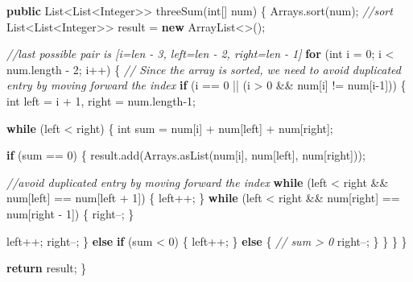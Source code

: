 \documentclass[]{book}
\newenvironment{Shaded}{\begin{snugshade}}{\end{snugshade}}
\newcommand{\BuiltInTok}[1]{#1}
\newcommand{\CommentTok}[1]{\textcolor[rgb]{0.56,0.35,0.01}{\textit{#1}}}
\newcommand{\DataTypeTok}[1]{\textcolor[rgb]{0.13,0.29,0.53}{#1}}
\newcommand{\DecValTok}[1]{\textcolor[rgb]{0.00,0.00,0.81}{#1}}
\newcommand{\FunctionTok}[1]{\textcolor[rgb]{0.00,0.00,0.00}{#1}}
\newcommand{\KeywordTok}[1]{\textcolor[rgb]{0.13,0.29,0.53}{\textbf{#1}}}
\newcommand{\NormalTok}[1]{#1}
\begin{document}
\begin{Shaded}
\begin{Highlighting}[]
\KeywordTok{public} \BuiltInTok{List}\NormalTok{<}\BuiltInTok{List}\NormalTok{<}\BuiltInTok{Integer}\NormalTok{>> }\FunctionTok{threeSum}\NormalTok{(}\DataTypeTok{int}\NormalTok{[] num) \{}
    \BuiltInTok{Arrays}\NormalTok{.}\FunctionTok{sort}\NormalTok{(num); }\CommentTok{//sort}
    \BuiltInTok{List}\NormalTok{<}\BuiltInTok{List}\NormalTok{<}\BuiltInTok{Integer}\NormalTok{>> result = }\KeywordTok{new} \BuiltInTok{ArrayList}\NormalTok{<>();}

    \CommentTok{//last possible pair is [i=len - 3, left=len - 2, right=len - 1]}
    \KeywordTok{for}\NormalTok{ (}\DataTypeTok{int}\NormalTok{ i = }\DecValTok{0}\NormalTok{; i < num.}\FunctionTok{length}\NormalTok{ - }\DecValTok{2}\NormalTok{; i++) \{}
        \CommentTok{// Since the array is sorted, we need to avoid duplicated entry by moving forward the index}
        \KeywordTok{if}\NormalTok{ (i == }\DecValTok{0}\NormalTok{ || (i > }\DecValTok{0}\NormalTok{ && num[i] != num[i}\DecValTok{-1}\NormalTok{])) \{}
            \DataTypeTok{int}\NormalTok{ left = i + }\DecValTok{1}\NormalTok{, right = num.}\FunctionTok{length}\DecValTok{-1}\NormalTok{;}

            \KeywordTok{while}\NormalTok{ (left < right) \{}
                \DataTypeTok{int}\NormalTok{ sum = num[i] + num[left] + num[right];}

                \KeywordTok{if}\NormalTok{ (sum == }\DecValTok{0}\NormalTok{) \{}
\NormalTok{                    result.}\FunctionTok{add}\NormalTok{(}\BuiltInTok{Arrays}\NormalTok{.}\FunctionTok{asList}\NormalTok{(num[i], num[left], num[right]));}

                    \CommentTok{//avoid duplicated entry by moving forward the index}
                    \KeywordTok{while}\NormalTok{ (left < right && num[left] == num[left + }\DecValTok{1}\NormalTok{]) \{}
\NormalTok{                        left++;}
\NormalTok{                    \}}
                    \KeywordTok{while}\NormalTok{ (left < right && num[right] == num[right - }\DecValTok{1}\NormalTok{]) \{}
\NormalTok{                        right--;}
\NormalTok{                    \}}

\NormalTok{                    left++;}
\NormalTok{                    right--;}
\NormalTok{                \} }\KeywordTok{else} \KeywordTok{if}\NormalTok{ (sum < }\DecValTok{0}\NormalTok{) \{}
\NormalTok{                    left++;}
\NormalTok{                \} }\KeywordTok{else}\NormalTok{ \{}
                    \CommentTok{// sum > 0}
\NormalTok{                    right--;}
\NormalTok{                \}}
\NormalTok{            \}}
\NormalTok{        \}}
\NormalTok{    \}}

    \KeywordTok{return}\NormalTok{ result;}
\NormalTok{\}}
\end{Highlighting}
\end{Shaded}
\end{document}
